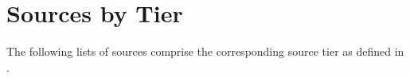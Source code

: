 \chapter{Sources by Tier}\label{app-src-tiers}

The following lists of sources comprise the corresponding source tier as
defined in .

\section{}

\section{}

\section{}

\section{}
